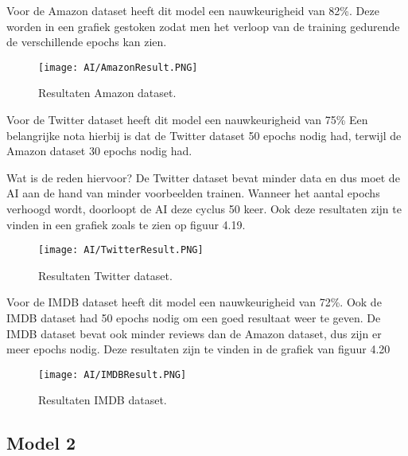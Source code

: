 Voor de Amazon dataset heeft dit model een nauwkeurigheid van 82\%. Deze worden in een grafiek gestoken zodat men het verloop van de training gedurende de verschillende epochs kan zien. 

\begin{figure}[!htbp]
    \texttt{[image: AI/AmazonResult.PNG]}
    \caption{\label{amazonresult}Resultaten Amazon dataset.}
\end{figure}
\FloatBarrier

Voor de Twitter dataset heeft dit model een nauwkeurigheid van 75\%
Een belangrijke nota hierbij is dat de Twitter dataset 50 epochs nodig had, terwijl de Amazon dataset 30 epochs nodig had.

Wat is de reden hiervoor?
De Twitter dataset bevat minder data en dus moet de AI aan de hand van minder voorbeelden trainen. Wanneer het aantal epochs verhoogd wordt, doorloopt de AI deze cyclus 50 keer. 
Ook deze resultaten zijn te vinden in een grafiek zoals te zien op figuur 4.19. 

\begin{figure}[!htbp]
    \texttt{[image: AI/TwitterResult.PNG]}
    \caption{\label{twitterresult}Resultaten Twitter dataset.}
\end{figure}
\FloatBarrier

Voor de IMDB dataset heeft dit model een nauwkeurigheid van 72\%.
Ook de IMDB dataset had 50 epochs nodig om een goed resultaat weer te geven. De IMDB dataset bevat ook minder reviews dan de Amazon dataset, dus zijn er meer epochs nodig. Deze resultaten zijn te vinden in de grafiek van figuur 4.20

\begin{figure}[!htbp]
    \texttt{[image: AI/IMDBResult.PNG]}
    \caption{\label{imdbresult}Resultaten IMDB dataset.}
\end{figure}
\FloatBarrier

\subsection{Model 2}
